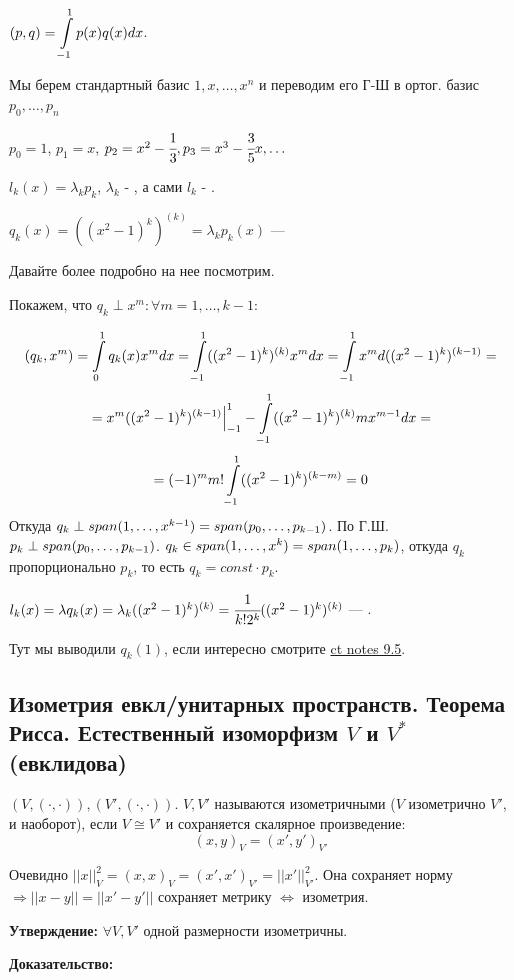 $(p,q) = \displaystyle\int\limits_{-1}^{1}p(x)q(x)dx$.

Мы берем стандартный базис $1,x,\ldots,x^n$ и переводим его Г-Ш в ортог. базис $p_0,\ldots, p_n$

$p_0 = 1$, $p_1 = x$, $p_2 = x^2-\cfrac{1}{3}, p_3 = {x^3}-{\cfrac{3}{5}x}, \ldots$

$l_k(x) = \lambda_k p_k$, $\lambda_k$ - , а сами $l_k$ - .

$q_k(x) = ((x^2-1)^k)^{(k)} = \lambda_k p_k(x)$ --- 

Давайте более подробно на нее посмотрим. 

Покажем, что $q_k \perp x^m: \forall m = 1,\ldots, k-1$:

$$(q_k, x^m) = \displaystyle\int\limits_{0}^{1}q_k(x) x^m dx = \displaystyle\int\limits_{-1}^{1}((x^2-1)^k)^{(k)}x^m dx = \displaystyle\int\limits_{-1}^{1}x^m d ((x^2-1)^k)^{(k-1)} = $$
$$= x^m ((x^2-1)^k)^{(k-1)}\Big|_{-1}^1 - \displaystyle\int\limits_{-1}^{1}((x^2-1)^k)^{(k)}m x^{m-1}dx = $$
$$ = (-1)^m m! \displaystyle\int\limits_{-1}^{1}((x^2-1)^k)^{(k-m)} =0$$
Откуда $q_k \perp span(1,\ldots, x^{k-1}) = span(p_0,\ldots,p_{k-1})$. По Г.Ш. $p_k \perp span (p_0,\ldots, p_{k-1})$. $q_k\in span(1,\ldots, x^k) = span (1,\ldots, p_k)$, откуда $q_k$ пропорционально $p_k$, то есть $q_k = const \cdot p_k$.

$l_k(x) = \lambda q_k(x) = \lambda_k ((x^2-1)^k)^{(k)} = \cfrac{1}{k!2^k}((x^2-1)^k)^{(k)}$ --- .

Тут мы выводили $q_k(1)$, если интересно смотрите \href{https://t.me/c/2402207436/2045/2131}{ct notes 9.5}.

\pagebreak
\subsection{Изометрия евкл/унитарных пространств. Теорема Рисса. Естественный изоморфизм $V$ и $V^*$ (евклидова)}

 $(V, (\cdot,\cdot)), (V', (\cdot,\cdot))$. $V, V'$ называются изометричными ($V$ изометрично $V'$, и наоборот), если $V \cong V'$ и сохраняется скалярное произведение:
$$(x,y)_V = (x',y')_{V'}$$

Очевидно $||x||^2_V = (x,x)_V =(x',x')_{V'} = ||x'||^2_{V'}$. Она сохраняет норму $\Rightarrow||x-y|| = ||x'-y'||$ сохраняет метрику $\Leftrightarrow$ изометрия.

\textbf{Утверждение:} $\forall V, V'$ одной размерности изометричны.

\textbf{Доказательство:}

